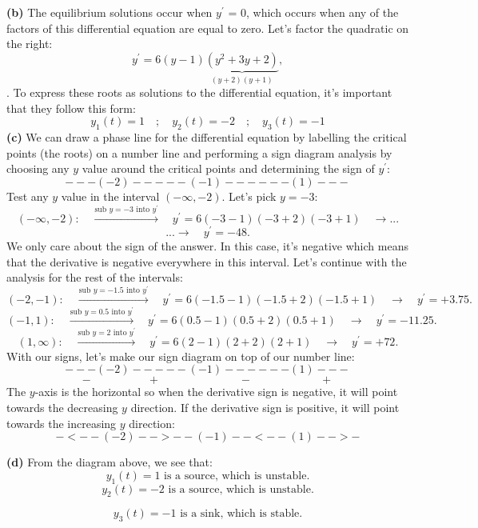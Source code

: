 \documentclass[a4paper,12pt]{article}
\begin{document}
\textbf{(b)} The equilibrium solutions occur when $y^{\prime}$ = 0, which occurs when any of the factors of this differential equation are equal to zero. Let's factor the quadratic on the right:
$$ y^{\prime} = 6(y-1)\underbrace{(y^2+3y+2)}_{(y + 2)(y + 1)}, $$
. To express these roots as solutions to the differential equation, it's important that they follow this form:
$$ \boxed{y_1(t) = 1 \quad;\quad y_2(t) = -2 \quad;\quad y_3(t) = -1}$$
\textbf{(c)} We can draw a phase line for the differential equation by labelling the critical points (the roots) on a number line and performing a sign diagram analysis by choosing any $y$ value around the critical points and determining the sign of $y^{\prime}$:\\
$$ ---(-2)-----(-1)------(1)--- $$
Test any $y$ value in the interval $(-\infty, -2)$. Let's pick $y=-3$:
$$ (-\infty, -2): \quad\overset{\text{sub }y=-3\text{ into }y^{\prime}}\rightarrow \quad y^{\prime} = 6(-3-1)(-3 + 2)(-3+1) \quad\rightarrow ... $$
$$ ...\rightarrow \quad y^{\prime} = -48. $$
We only care about the sign of the answer. In this case, it's negative which means that the derivative is negative everywhere in this interval. Let's continue with the analysis for the rest of the intervals:
$$ (-2,-1): \quad\overset{\text{sub }y=-1.5\text{ into }y^{\prime}}\rightarrow \quad y^{\prime} = 6(-1.5-1)(-1.5+2)(-1.5+1) \quad\rightarrow \quad y^{\prime}=+3.75.$$
$$ (-1,1): \quad\overset{\text{sub }y=0.5\text{ into }y^{\prime}}\rightarrow \quad y^{\prime} = 6(0.5-1)(0.5+2)(0.5+1) \quad\rightarrow \quad y^{\prime} = -11.25.$$
$$ (1,\infty): \quad\overset{\text{sub }y=2\text{ into }y^{\prime}}\rightarrow \quad y^{\prime} = 6(2-1)(2+2)(2+1) \quad\rightarrow \quad y^{\prime} = +72. $$
With our signs, let's make our sign diagram on top of our number line:
$$ ---(-2)-----(-1)------(1)---  $$
$$ - \quad\quad\quad\quad\quad + \quad\quad\quad\quad\quad\quad\quad - \quad\quad\quad\quad\quad\quad + $$
The $y$-axis is the horizontal so when the derivative sign is negative, it will point towards the decreasing $y$ direction. If the derivative sign is positive, it will point towards the increasing $y$ direction:
$$ -<--(-2)-->--(-1)--<--(1)-->- $$
\pagebreak

\textbf{(d)} From the diagram above, we see that:
$$ \boxed{y_1(t) =1 \text{ is a source, which is unstable.}} $$
$$ \boxed{y_2(t) =-2 \text{ is a source, which is unstable.}} $$

$$\boxed{y_3(t) =-1 \text{ is a sink, which is stable.}} $$
\end{document}
